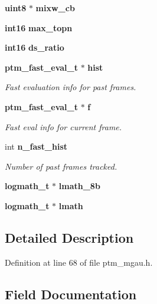 \begin{DoxyCompactItemize}
\item 
{\bf uint8} $\ast$ {\bfseries mixw\-\_\-cb}\label{structptm__mgau__s_a5a3c76d47b94978f717a65fa0dfb54e8}

\item 
{\bf int16} {\bfseries max\-\_\-topn}\label{structptm__mgau__s_ab397cfdf51d309de4521edc09e80541d}

\item 
{\bf int16} {\bfseries ds\-\_\-ratio}\label{structptm__mgau__s_a2254b6ec79c97516b326ad33d22d0050}

\item 
{\bf ptm\-\_\-fast\-\_\-eval\-\_\-t} $\ast$ {\bf hist}
\begin{DoxyCompactList}\small\item\em \-Fast evaluation info for past frames. \end{DoxyCompactList}\item 
{\bf ptm\-\_\-fast\-\_\-eval\-\_\-t} $\ast$ {\bf f}
\begin{DoxyCompactList}\small\item\em \-Fast eval info for current frame. \end{DoxyCompactList}\item 
int {\bf n\-\_\-fast\-\_\-hist}
\begin{DoxyCompactList}\small\item\em \-Number of past frames tracked. \end{DoxyCompactList}\item 
{\bf logmath\-\_\-t} $\ast$ {\bfseries lmath\-\_\-8b}\label{structptm__mgau__s_ad577181af2afca66f33f1f1e4c576ae8}

\item 
{\bf logmath\-\_\-t} $\ast$ {\bfseries lmath}\label{structptm__mgau__s_abbaabfb8678356673a2c0a515e33a378}

\end{DoxyCompactItemize}


\subsection{\-Detailed \-Description}


\-Definition at line 68 of file ptm\-\_\-mgau.\-h.



\subsection{\-Field \-Documentation}

